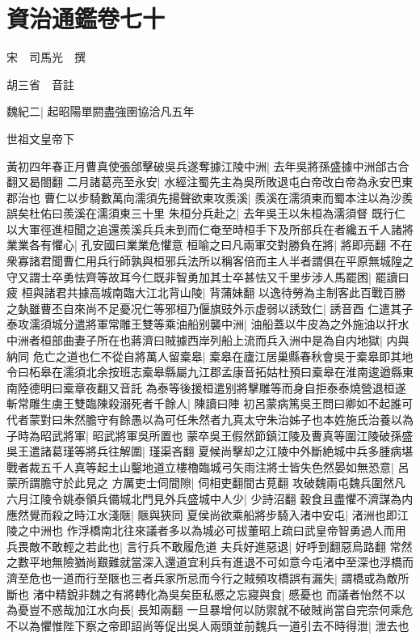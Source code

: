 \chapter{資治通鑑卷七十}
宋　司馬光　撰

胡三省　音註

魏紀二|{
	起昭陽單閼盡強圉協洽凡五年}


世祖文皇帝下

黃初四年春正月曹真使張郃擊破吳兵遂奪據江陵中洲|{
	去年吳將孫盛據中洲郃古合翻又曷閤翻}
二月諸葛亮至永安|{
	水經注蜀先主為吳所敗退屯白帝改白帝為永安巴東郡治也}
曹仁以步騎數萬向濡須先揚聲欲東攻羨溪|{
	羨溪在濡須東而蜀本注以為沙羨誤矣杜佑曰羨溪在濡須東三十里}
朱桓分兵赴之|{
	去年吳王以朱桓為濡須督}
既行仁以大軍徑進桓聞之追還羨溪兵兵未到而仁奄至時桓手下及所部兵在者纔五千人諸將業業各有懼心|{
	孔安國曰業業危懼意}
桓喻之曰凡兩軍交對勝負在將|{
	將即亮翻}
不在衆寡諸君聞曹仁用兵行師孰與桓邪兵法所以稱客倍而主人半者謂俱在平原無城隍之守又謂士卒勇怯齊等故耳今仁既非智勇加其士卒甚怯又千里步涉人馬罷困|{
	罷讀曰疲}
桓與諸君共據高城南臨大江北背山陵|{
	背蒲妹翻}
以逸待勞為主制客此百戰百勝之埶雖曹丕自來尚不足憂况仁等邪桓乃偃旗豉外示虚弱以誘致仁|{
	誘音酉}
仁遣其子泰攻濡須城分遣將軍常雕王雙等乘油船别襲中洲|{
	油船蓋以牛皮為之外施油以扞水}
中洲者桓部曲妻子所在也蔣濟曰賊據西岸列船上流而兵入洲中是為自内地獄|{
	内與納同}
危亡之道也仁不從自將萬人留槖皋|{
	槖皋在廬江居巢縣春秋會吳于槖皋即其地令曰柘皋在濡須北余按班志槖皋縣屬九江郡孟康音拓姑杜預曰槖皋在淮南逡遒縣東南陸德明曰槖章夜翻又音託}
為泰等後援桓遣别將擊雕等而身自拒泰泰燒營退桓遂斬常雕生虜王雙臨陳殺溺死者千餘人|{
	陳讀曰陣}
初呂蒙病篤吳王問曰卿如不起誰可代者蒙對曰朱然膽守有餘愚以為可任朱然者九真太守朱治姊子也本姓施氏治養以為子時為昭武將軍|{
	昭武將軍吳所置也}
蒙卒吳王假然節鎮江陵及曹真等圍江陵破孫盛吳王遣諸葛瑾等將兵往解圍|{
	瑾渠吝翻}
夏候尚擊却之江陵中外斷絶城中兵多腫病堪戰者裁五千人真等起土山鑿地道立樓櫓臨城弓矢雨注將士皆失色然晏如無恐意|{
	呂蒙所謂膽守於此見之}
方厲吏士伺間隙|{
	伺相吏翻間古莧翻}
攻破魏兩屯魏兵圍然凡六月江陵令姚泰領兵備城北門見外兵盛城中人少|{
	少詩沼翻}
穀食且盡懼不濟謀為内應然覺而殺之時江水淺陿|{
	陿與狹同}
夏侯尚欲乘船將步騎入渚中安屯|{
	渚洲也即江陵之中洲也}
作浮橋南北往來議者多以為城必可拔董昭上疏曰武皇帝智勇過人而用兵畏敵不敢輕之若此也|{
	言行兵不敢履危道}
夫兵好進惡退|{
	好呼到翻惡烏路翻}
常然之數平地無險猶尚艱難就當深入還道宜利兵有進退不可如意今屯渚中至深也浮橋而濟至危也一道而行至陿也三者兵家所忌而今行之賊頻攻橋誤有漏失|{
	謂橋或為敵所斷也}
渚中精銳非魏之有將轉化為吳矣臣私慼之忘寢與食|{
	慼憂也}
而議者怡然不以為憂豈不惑哉加江水向長|{
	長知兩翻}
一旦暴增何以防禦就不破賊尚當自完奈何乘危不以為懼惟陛下察之帝即詔尚等促出吳人兩頭並前魏兵一道引去不時得泄|{
	泄去也}
